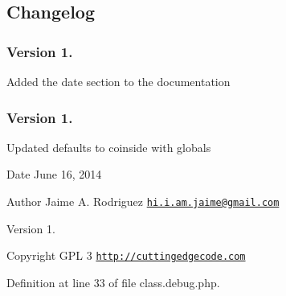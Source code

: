 \hypertarget{nav1_changelog}{}\subsection{Changelog}\label{nav1_changelog}
\subsubsection*{Version 1.}


\begin{DoxyItemize}
\item Added the date section to the documentation
\end{DoxyItemize}

\subsubsection*{Version 1.}


\begin{DoxyItemize}
\item Updated defaults to coinside with globals
\end{DoxyItemize}

\begin{DoxyDate}{Date}
June 16, 2014 
\end{DoxyDate}
\begin{DoxyAuthor}{Author}
Jaime A. Rodriguez \href{mailto:hi.i.am.jaime@gmail.com}{\tt hi.\-i.\-am.\-jaime@gmail.\-com} 
\end{DoxyAuthor}
\begin{DoxyVersion}{Version}
1. 
\end{DoxyVersion}
\begin{DoxyCopyright}{Copyright}
G\-P\-L 3 \href{http://cuttingedgecode.com}{\tt http\-://cuttingedgecode.\-com} 
\end{DoxyCopyright}


Definition at line 33 of file class.\-debug.\-php.



